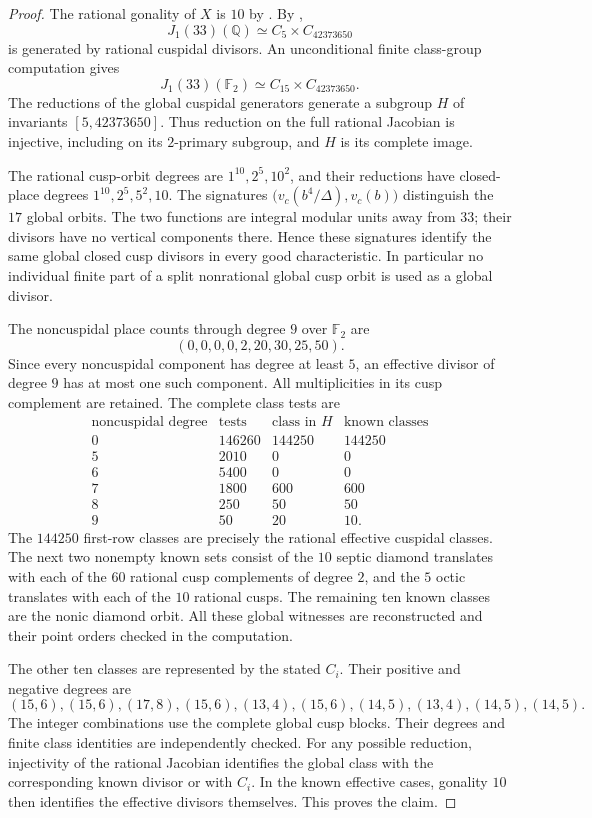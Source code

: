 \begin{proof}
The rational gonality of $X$ is $10$ by \cite[Table~1]{DvH}.
By \cite[Theorem~3.1(2), Theorem~4.13 and Table~2]{DEHMZ},
\[
 J_1(33)(\mathbb Q)\simeq C_5\times C_{42373650}
\]
is generated by rational cuspidal divisors. An unconditional finite
class-group computation gives
\[
 J_1(33)(\mathbb F_2)\simeq C_{15}\times C_{42373650}.
\]
The reductions of the global cuspidal generators generate a subgroup
$H$ of invariants $[5,42373650]$. Thus reduction on the full rational
Jacobian is injective, including on its $2$-primary subgroup, and
$H$ is its complete image.

The rational cusp-orbit degrees are $1^{10},2^5,10^2$, and their
reductions have closed-place degrees $1^{10},2^5,5^2,10$.
The signatures
$\bigl(v_c(b^4/\Delta),v_c(b)\bigr)$ distinguish the $17$ global
orbits. The two functions are integral modular units away from $33$;
their divisors have no vertical components there. Hence these
signatures identify the same global closed cusp divisors in every
good characteristic. In particular no individual finite part of a
split nonrational global cusp orbit is used as a global divisor.

The noncuspidal place counts through degree $9$ over $\mathbb F_2$
are
\[
 (0,0,0,0,2,20,30,25,50).
\]
Since every noncuspidal component has degree at least $5$, an
effective divisor of degree $9$ has at most one such component.
All multiplicities in its cusp complement are retained.
The complete class tests are
\[
\begin{array}{c|r|r|r}
\text{noncuspidal degree}&\text{tests}&\text{class in }H&
 \text{known classes}\\\hline
0&146260&144250&144250\\
5&2010&0&0\\
6&5400&0&0\\
7&1800&600&600\\
8&250&50&50\\
9&50&20&10.
\end{array}
\]
The $144250$ first-row classes are precisely the rational effective
cuspidal classes. The next two nonempty known sets consist of the
$10$ septic diamond translates with each of the $60$ rational cusp
complements of degree $2$, and the $5$ octic translates with each of
the $10$ rational cusps. The remaining ten known classes are the
nonic diamond orbit. All these global witnesses are reconstructed
and their point orders checked in the computation.

The other ten classes are represented by the stated $C_i$.
Their positive and negative degrees are
\[
 (15,6),(15,6),(17,8),(15,6),(13,4),
 (15,6),(14,5),(13,4),(14,5),(14,5).
\]
The integer combinations use the complete global cusp blocks.
Their degrees and finite class identities are independently checked.
For any possible reduction, injectivity of the rational Jacobian
identifies the global class with the corresponding known divisor or
with $C_i$. In the known effective cases, gonality $10$ then
identifies the effective divisors themselves. This proves the claim.


\end{proof}
